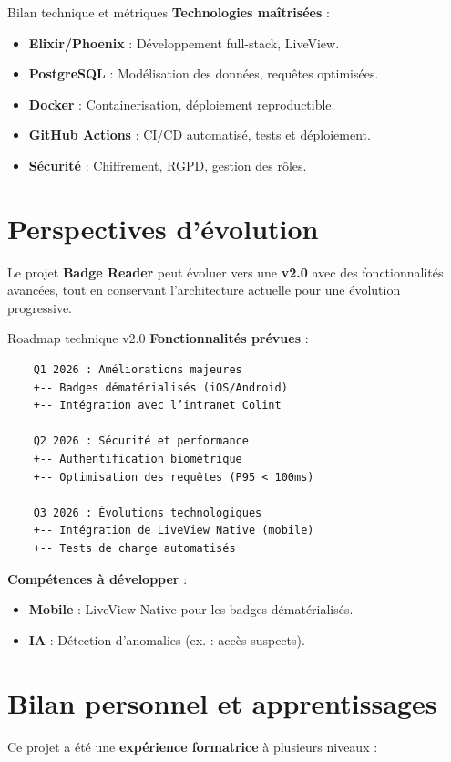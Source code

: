 \begin{for_you}{Bilan technique et métriques}
    \textbf{\newline Technologies maîtrisées} :
    \begin{itemize}
        \item \textbf{Elixir/Phoenix} : Développement full-stack, LiveView.
        \item \textbf{PostgreSQL} : Modélisation des données, requêtes optimisées.
        \item \textbf{Docker} : Containerisation, déploiement reproductible.
        \item \textbf{GitHub Actions} : CI/CD automatisé, tests et déploiement.
        \item \textbf{Sécurité} : Chiffrement, RGPD, gestion des rôles.
    \end{itemize}
\end{for_you}

\newpage

\section{Perspectives d'évolution}
Le projet \textbf{Badge Reader} peut évoluer vers une \textbf{v2.0} avec des fonctionnalités avancées, tout en conservant l’architecture actuelle pour une évolution progressive.

\begin{for_you}{Roadmap technique v2.0}
    \textbf{Fonctionnalités prévues} :
    \begin{verbatim}
    Q1 2026 : Améliorations majeures
    +-- Badges dématérialisés (iOS/Android)
    +-- Intégration avec l’intranet Colint

    Q2 2026 : Sécurité et performance
    +-- Authentification biométrique
    +-- Optimisation des requêtes (P95 < 100ms)

    Q3 2026 : Évolutions technologiques
    +-- Intégration de LiveView Native (mobile)
    +-- Tests de charge automatisés
    \end{verbatim}

    \textbf{Compétences à développer} :
    \begin{itemize}
        \item \textbf{Mobile} : LiveView Native pour les badges dématérialisés.
        \item \textbf{IA} : Détection d’anomalies (ex. : accès suspects).
    \end{itemize}
\end{for_you}

\section{Bilan personnel et apprentissages}
Ce projet a été une \textbf{expérience formatrice} à plusieurs niveaux :

